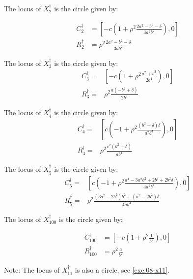 \begin{proposition}
The locus of $X_2^\dagger$ is the circle given by:

\begin{align*}
C_2^\dagger&=\left[-c\left(1+\rho^2\frac{2a^2-b^2-\delta}{3 a^2 b^2}\right),0\right]\\
R_2^\dagger&=\rho^2\frac{2 a^2-b^2-\delta}{3 a b^2}
\end{align*}
\end{proposition}

\begin{proposition}
The locus of $X_3^\dagger$ is the circle given by:
\begin{align*}
C_3^\dagger=&\left[-c\left(1+\rho^2\frac{a^2+b^2}{2b^4}\right), 0\right]\\
R_3^\dagger=&\rho^2\frac{a(-b^2+\delta)}{2b^4}
\end{align*}
\end{proposition}

\begin{proposition}
The locus of $X_4^\dagger$ is the circle given by:
\begin{align*}
C_4^\dagger=&\left[c\left(-1+\rho^2\frac{(b^2+\delta) \delta}{a^2 b^4}\right), 0\right]\\
R_4^\dagger=&\rho^2\frac{c^2(b^2+\delta)}{a b^4}
\end{align*}
\end{proposition}

\begin{proposition}
The locus of $X_5^\dagger$ is the circle given by:
\begin{align*}
C_5^\dagger=&\left[c\left(-1+ \rho^2\frac{a^4 - 3 a^2 b^2+2 b^4 + 2 b^2 \delta}{4 a^2 b^4}\right), 0\right]\\
R_5^\dagger=&\rho^2\frac{(3a^2-2b^2)b^2+(a^2-2b^2)\delta}{4a b^2}
\end{align*}
\end{proposition}

\begin{proposition}
The locus of $X_{100}^\dagger$ is the circle given by:

\begin{align*}
C_{100}^\dagger&=\left[-c\left(1+\rho^2\frac{1}{b^2}\right),0\right]\\
R_{100}^\dagger&=\rho^2\frac{a}{b^2}
\end{align*}
\end{proposition}

Note: The locus of $X_{11}^\dagger$ is also a circle, see \cref{exe:08-x11}.

